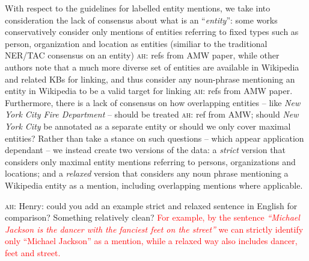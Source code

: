 \documentclass{llncs}
\newcommand{\ah}[1]{{\color{blue}\textsc{ah:} #1}}
\begin{document}
With respect to the guidelines for labelled entity mentions, we take into consideration the lack of consensus about what is an ``\textit{entity}'': some works conservatively consider only mentions of entities referring to fixed types such as person, organization and location as entities (similiar to the traditional NER/TAC consensus on an entity) \ah{refs from AMW paper}, while other authors note that a much more diverse set of entities are available in Wikipedia and related KBs for linking, and thus consider any noun-phrase mentioning an entity in Wikipedia to be a valid target for linking \ah{refs from AMW paper}. Furthermore, there is a lack of consensus on how overlapping entities -- like \textit{New York City Fire Department} -- should be treated \ah{ref from AMW}; should \textit{New York City} be annotated as a separate entity or should we only cover maximal entities? Rather than take a stance on such questions -- which appear application dependant -- we instead create two versions of the data: a \textit{strict} version that considers only maximal entity mentions referring to persons, organizations and locations; and a \textit{relaxed} version that considers any noun phrase mentioning a Wikipedia entity as a mention, including overlapping mentions where applicable.

\ah{Henry: could you add an example strict and relaxed sentence in English for comparison? Something relatively clean?}
\textcolor{red}{For example, by the sentence \textit{``Michael Jackson is the dancer with the fanciest feet on the street''} we can strictly identify only ``Michael Jackson'' as a mention, while a relaxed way also includes dancer, feet and street.}

\end{document}
